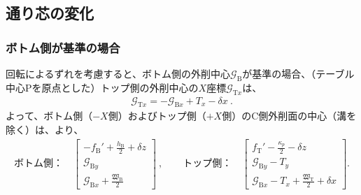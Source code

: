 \subsection{通り芯の変化}

\subsubsection{ボトム側が基準の場合}
回転によるずれを考慮すると、ボトム側の外削中心$\mathcal G_\mathrm B$が基準の場合、（テーブル中心Pを原点とした）トップ側の外削中心の$X$座標$\mathcal G_{\mathrm Tx}$は、
\begin{align*}
  \mathcal G_{\mathrm Tx} = -\mathcal G_{\mathrm Bx}+T_x-\delta x\ .
\end{align*}
よって、ボトム側（$-X$側）およびトップ側（$+X$側）のC側外削面の中心（溝を除く）は、より、
\begin{align*}
  \text{ボトム側：}\quad
  \left[
    \begin{array}{c}
      \displaystyle -f_\mathrm B'+\frac{h_\mathrm B}2+\delta z\\[5pt]
      \mathcal G_{\mathrm By}\\[3pt]
      \displaystyle \mathcal G_{\mathrm Bx}+\frac{\mathfrak W_\mathrm B}2
    \end{array}
    \right]~, \qquad
  \text{トップ側：}\quad
  \left[
    \begin{array}{c}
      \displaystyle f_\mathrm T'-\frac{\kappa_p}2-\delta z\\[5pt]
      \mathcal G_{\mathrm By}-T_y\\[3pt]
      \displaystyle \mathcal G_{\mathrm Bx}-T_x+\frac{\mathfrak W_\mathrm T}2+\delta x
    \end{array}
  \right].
\end{align*}

